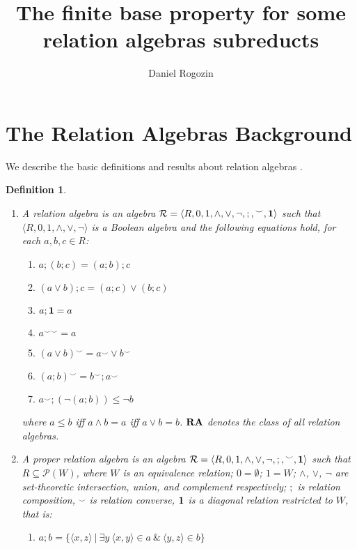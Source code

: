 \documentclass[a4paper]{article}
\author{Daniel Rogozin}
\date{}
\title{The finite base property for some relation algebras subreducts}
\theoremstyle{defin}
\newtheorem{defin}{Definition}
\theoremstyle{theorem}
\theoremstyle{prop}
\theoremstyle{lemma}
\theoremstyle{ex}
\theoremstyle{col}
\begin{document}
\maketitle

\nocite{*}

\section{The Relation Algebras Background}

We describe the basic definitions and results about relation algebras \cite{hirsch2002relation} \cite{maddux2006relation}.

\begin{defin}
  $ $

  \begin{enumerate}
    \item A relation algebra is an algebra $\mathcal{R} = \langle R, 0, 1, \wedge, \vee, \neg, ;, {}^{\smile}, {\bf 1 }\rangle$ such that $\langle R, 0, 1, \wedge, \vee, \neg \rangle$ is a Boolean algebra and the following
    equations hold, for each $a, b, c \in R$:
    \begin{enumerate}
      \item $a ; (b ; c) = (a ; b) ; c$
      \item $(a \vee b) ; c = (a ; c) \vee (b ; c)$
      \item $a ; {\bf 1} = a$
      \item $a^{\smile \smile} = a$
      \item $(a \vee b)^{\smile} = a^{\smile} \vee b^{\smile}$
      \item $(a ; b)^{\smile} = b^{\smile} ; a^{\smile}$
      \item $a^{\smile} ; (\neg (a ; b)) \leq \neg b$
    \end{enumerate}
    where $a \leq b$ iff $a \wedge b = a$ iff $a \vee b = b$. ${\bf RA}$ denotes the class of all relation
    algebras.
    \item A proper relation algebra is an algebra $\mathcal{R} = \langle R, 0, 1, \wedge, \vee, \neg, ;, {}^{\smile}, {\bf 1 }\rangle$ such that $R \subseteq \mathcal{P}(W)$, where $W$ is an equivalence relation; $0 = \emptyset$; $1 = W$; $\wedge$, $\vee$, $\neg$ are set-theoretic intersection, union, and
    complement respectively; $;$ is relation composition, ${}^{\smile}$ is relation converse, ${\bf 1}$ is a
    diagonal relation restricted to $W$, that is:
    \begin{enumerate}
    \item $a ; b = \{ \langle x, z \rangle \: | \: \exists y \: \langle x, y \rangle \in a \: \& \: \langle y, z \rangle \in b \}$

\end{enumerate}
\end{enumerate}
\end{defin}
\end{document}
